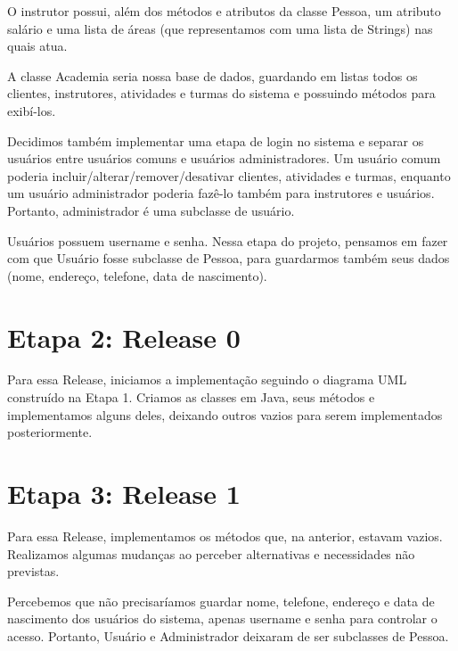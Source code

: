 \documentclass[11pt,twoside]{article}
\begin{document}
O instrutor possui, além dos métodos e atributos da classe Pessoa, um atributo salário e uma lista de áreas
(que representamos com uma lista de Strings) nas quais atua.

A classe Academia seria nossa base de dados, guardando em listas todos os clientes, instrutores, atividades e turmas do sistema
e possuindo métodos para exibí-los.

Decidimos também implementar uma etapa de login no sistema e separar os usuários entre usuários comuns e usuários administradores.
Um usuário comum poderia incluir/alterar/remover/desativar clientes, atividades e turmas, enquanto um usuário administrador
poderia fazê-lo também para instrutores e usuários. Portanto, administrador é uma subclasse de usuário.

Usuários possuem username e senha. Nessa etapa do projeto, pensamos em fazer com que Usuário fosse subclasse de Pessoa, para
guardarmos também seus dados (nome, endereço, telefone, data de nascimento).

\section{Etapa 2: Release 0}
Para essa Release, iniciamos a implementação seguindo o diagrama UML construído na Etapa 1. Criamos as classes em Java, seus métodos
e implementamos alguns deles, deixando outros vazios para serem implementados posteriormente.

\section{Etapa 3: Release 1}
Para essa Release, implementamos os métodos que, na anterior, estavam vazios. Realizamos algumas mudanças ao perceber alternativas
e necessidades não previstas.

Percebemos que não precisaríamos guardar nome, telefone, endereço e data de nascimento dos usuários do sistema, apenas username e
senha para controlar o acesso. Portanto, Usuário e Administrador deixaram de ser subclasses de Pessoa.
\end{document}
